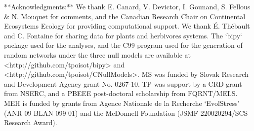 **Acknowledgments:** We thank E. Canard, V. Devictor, I. Gounand, S.
Fellous & N. Mouquet for comments, and the Canadian Research Chair on
Continental Ecosystems Ecology for providing computational support. We
thank É. Thébault and C. Fontaine for sharing data for plants and
herbivores systems. The `bipy` package used for the analyses, and
the C99 program used for the generation of random networks under the
three null models are available at <http://github.com/tpoisot/bipy> and
<http://github.com/tpoisot/CNullModels>. MS was funded by Slovak Research and
Development Agency grant No. 0267-10. TP was support by a CRD grant from NSERC,
and a PBEEE post-doctoral scholarship from FQRNT/MELS. MEH is funded by grants
from Agence Nationale de la Recherche ‘EvolStress’ (ANR-09-BLAN-099-01)
and the McDonnell Foundation (JSMF 220020294/SCS-Research Award).
